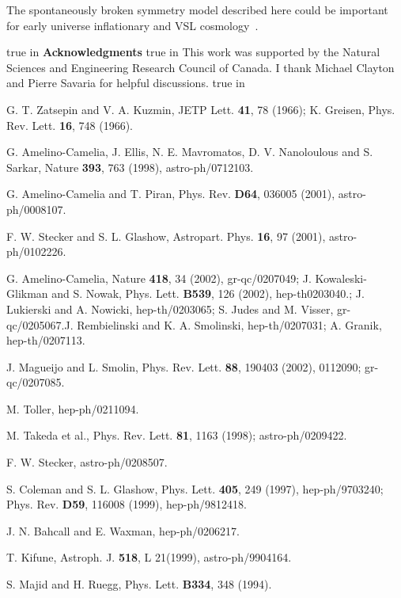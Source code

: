 \documentclass[a4paper,12pt]{article}
\begin{document}
{The spontaneously broken symmetry model described here could be important for
early universe inflationary and VSL cosmology~\cite{Linde,Moffat,Moffat2}.


 true in
\textbf{Acknowledgments}
 true in
This work was supported by the Natural Sciences and Engineering Research Council of
Canada. I thank Michael Clayton and Pierre Savaria for helpful discussions.
 true in

\begin{thebibliography}{99}

 G. T. Zatsepin and V. A. Kuzmin, JETP Lett. {\bf 41}, 78 (1966);
K. Greisen, Phys. Rev. Lett. {\bf 16}, 748 (1966).

 G. Amelino-Camelia, J. Ellis, N. E.
Mavromatos, D. V. Nanoloulous and S. Sarkar, Nature {\bf 393}, 763 (1998),
astro-ph/0712103.

 G. Amelino-Camelia and T. Piran, Phys. Rev. {\bf D64}, 036005 (2001),
astro-ph/0008107.

 F. W. Stecker and S. L. Glashow, Astropart. Phys. {\bf 16}, 97
(2001), astro-ph/0102226.

 G. Amelino-Camelia, Nature {\bf 418}, 34 (2002), gr-qc/0207049; J.
Kowaleski-Glikman and S. Nowak, Phys. Lett. {\bf B539}, 126 (2002), hep-th0203040.;
J. Lukierski and A. Nowicki, hep-th/0203065; S. Judes and M. Visser, gr-qc/0205067.J.
Rembielinski and K. A. Smolinski, hep-th/0207031; A. Granik, hep-th/0207113.

 J. Magueijo and L. Smolin, Phys. Rev. Lett. {\bf 88}, 190403 (2002),
0112090; gr-qc/0207085.

 M. Toller, hep-ph/0211094.

 M. Takeda et al., Phys. Rev. Lett. {\bf 81}, 1163
(1998); astro-ph/0209422.

 F. W. Stecker, astro-ph/0208507.

 S. Coleman and S. L. Glashow, Phys. Lett. {\bf 405}, 249
(1997), hep-ph/9703240; Phys. Rev. {\bf D59}, 116008 (1999), hep-ph/9812418.

 J. N. Bahcall and E. Waxman, hep-ph/0206217.

 T. Kifune, Astroph. J. {\bf 518}, L 21(1999), astro-ph/9904164.

 S. Majid and H. Ruegg, Phys. Lett. {\bf B334}, 348 (1994).


\end{thebibliography}}
\end{document}
